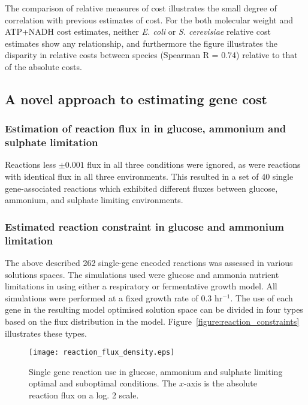 The comparison of relative measures of cost illustrates the small degree of correlation with previous estimates of cost. For the both molecular weight and ATP+NADH cost estimates, neither \emph{E. coli} or \emph{S. cerevisiae} relative cost estimates show any relationship, and furthermore the figure illustrates the disparity in relative costs between species (Spearman R = 0.74) relative to that of the absolute costs.

\subsection{A novel approach to estimating gene cost}%


\subsubsection{Estimation of reaction flux in in glucose, ammonium and sulphate limitation}%

Reactions less $\pm0.001$ flux in all three conditions were ignored, as were reactions with identical flux in all three environments. This resulted in a set of 40 single gene-associated reactions which exhibited different fluxes between glucose, ammonium, and sulphate limiting environments.

\subsubsection{Estimated reaction constraint in glucose and ammonium limitation}%

The above described 262 single-gene encoded reactions was assessed in various solutions spaces. The simulations used were glucose and ammonia nutrient limitations in using either a respiratory or fermentative growth model. All simulations were performed at a fixed growth rate of 0.3 hr$^{-1}$. The use of each gene in the resulting model optimised solution space can be divided in four types based on the flux distribution in the model. Figure~\vref{figure:reaction_constraints} illustrates these types.

\begin{figure}%
  \centering
  \texttt{[image: reaction\_flux\_density.eps]}
  \caption[Single gene reaction use in glucose, ammonium and sulphate limitation]{Single gene reaction use in glucose, ammonium and sulphate limiting optimal and suboptimal conditions. The $x$-axis is the absolute reaction flux on a log. 2 scale. }
  \label{figure:flux_distribution}
\end{figure}%

